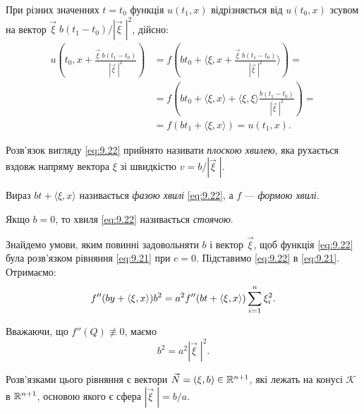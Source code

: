При різних значеннях $t = t_0$ функція $u(t_1, x)$ відрізняється від $u(t_0, x)$ зсувом на вектор $\vec \xi \; b (t_1 - t_0) / \left|\vec \xi \; \right|^2$, дійсно:
\begin{equation}
    \begin{aligned}
        u \left(t_0, x + \frac{\vec \xi \; b (t_1 - t_0)}{\left|\vec \xi\;\right|^2} \right) &= f \left(b t_0 + \langle \xi, x + \frac{\vec \xi \; b (t_1 - t_0)}{\left|\vec \xi\;\right|^2} \rangle \right) = \\
        &= f \left( b t_0 + \langle \xi, x\rangle + \langle \xi, \xi \rangle \frac{b (t_1 - t_0)}{\left|\vec \xi\;\right|^2} \right) = \\
        &= f (b t_1 + \langle \xi, x\rangle) = u(t_1, x).
    \end{aligned}
\end{equation}

\begin{definition}
    Розв'язок вигляду \eqref{eq:9.22} прийнято називати \textit{плоскою хвилею}, яка рухається вздовж напряму вектора $\xi$ зі швидкістю $v = b / \left|\vec \xi\;\right|$.    
\end{definition}

\begin{definition}
    Вираз $b t + \langle \xi, x \rangle$ називається \textit{фазою хвилі} \eqref{eq:9.22}, а $f$ --- \textit{формою хвилі}. 
\end{definition}

\begin{definition}
    Якщо $b = 0$, то хвиля \eqref{eq:9.22} називається \textit{стоячою}.
\end{definition}

Знайдемо умови, яким повинні задовольняти $b$ і вектор $\vec \xi$, щоб функція \eqref{eq:9.22} була розв'язком рівняння \eqref{eq:9.21} при $c = 0$. Підставимо \eqref{eq:9.22} в \eqref{eq:9.21}. Отримаємо: 
\begin{equation}
    f'' (b y + \langle \xi, x \rangle) b^2 = a^2 f''(b t + \langle \xi, x \rangle) \Sum_{i = 1}^n \xi_i^2.
\end{equation}

Вважаючи, що $f''(Q) \not\equiv 0$, маємо
\begin{equation}
    \label{eq:9.23}
    b^2 = a^2 \left| \vec \xi \; \right|^2.
\end{equation}

Розв'язками цього рівняння є вектори $\vec N = (\xi, b) \in \mathbb{R}^{n + 1}$, які лежать на конусі $\mathcal{K}$ в $\mathbb{R}^{n + 1}$, основою якого є сфера $\left| \vec \xi \; \right| = b / a$. 

